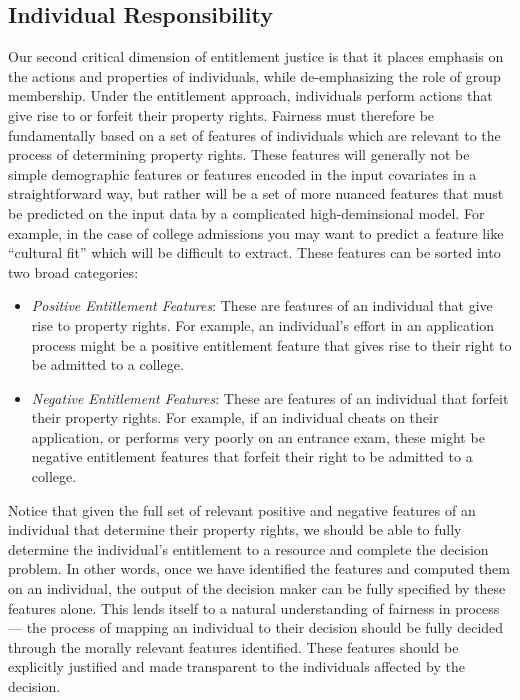\subsection{Individual Responsibility}

Our second critical dimension of entitlement justice is that it places
emphasis on the actions and properties of individuals, while de-emphasizing
the role of group membership. Under the entitlement approach, individuals
perform actions that give rise to or forfeit their property rights. Fairness
must therefore be fundamentally based on a set of features of individuals which
are relevant to the process of determining property rights. These features will
generally not be simple demographic features or features encoded in the input
covariates in a straightforward way, but rather will be a set of more nuanced
features that must be predicted on the input data by a complicated
high-deminsional model. For example, in the case of college admissions you may
want to predict a feature like ``cultural fit'' which will be difficult to
extract. These features can be sorted into two broad categories:
\begin{itemize}
    \item \emph{Positive Entitlement Features}: These are features of an
    individual that give rise to property rights. For example, an
    individual's effort in an application process might be a positive
    entitlement feature that gives rise to their right to be admitted
    to a college.
    \item \emph{Negative Entitlement Features}: These are features of an
    individual that forfeit their property rights. For example, if
    an individual cheats on their application, or performs very poorly on an
    entrance exam, these might be negative entitlement features that
    forfeit their right to be admitted to a college. 
\end{itemize}
Notice that given the full set of relevant positive and negative features of an
individual that determine their property rights, we should be able to fully
determine the individual's entitlement to a resource and complete the decision
problem. In other words, once we have identified the features and computed
them on an individual, the output of the decision maker can be fully specified
by these features alone. This lends itself to a natural understanding of
fairness in process — the process of mapping an individual to their decision
should be fully decided through the morally relevant features identified. These
features should be explicitly justified and made transparent to the
individuals affected by the decision. 

